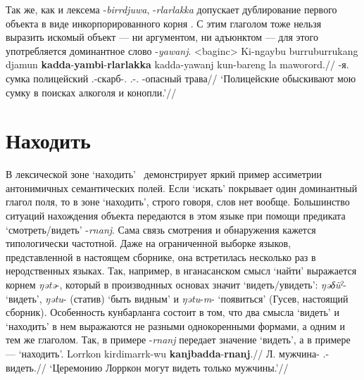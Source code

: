 Так же, как и лексема -\textit{birrdjuwa}, -\textit{rlarlakka} допускает дублирование первого объекта в виде инкорпорированного корня . С этим глаголом тоже нельзя выразить искомый объект --- ни аргументом, ни адъюнктом --- для этого употребляется доминантное слово -\textit{yawanj}.
\ex<baginc>\begingl
\gla Ki-ngaybu burruburrukang djamun \textbf{kadda}-\textbf{yambi}-\textbf{rlarlakka} kadda-yawanj kun-bareng la maworord.//
\glb \ki-я.\Gen{} сумка полицейский \Tpl.\Real-скарб-\rlk.\Np{} \Tpl.\Real-\yaw.\Np{} \Cliv-опасный \la{} трава//
\glft `Полицейские обыскивают мою сумку в поисках алкоголя и конопли.'//%
\endgl\xe


\section{Находить}
\label{sec:find}
В лексической зоне `находить' \ демонстрирует яркий пример ассиметрии антонимичных семантических полей. Если `искать' покрывает один доминантный глагол поля, то в зоне `находить', строго говоря, слов нет вообще. Большинство ситуаций нахождения объекта передаются в этом языке при помощи предиката `смотреть/видеть' -\textit{rnanj}. Сама связь смотрения и обнаружения кажется типологически частотной. Даже на ограниченной выборке языков, представленной в настоящем сборнике, она встретилась несколько раз в неродственных языках. Так, например, в нганасанском смысл `найти' выражается корнем \textit{ŋətə}-, который в производнных основах значит `видеть/увидеть': \textit{ŋəδüˀ}- `видеть', \textit{ŋətu}- (статив) `быть видным' и \textit{ŋətu}-\textit{m}- `появиться' (Гусев, настоящий сборник). Особенность кунбарланга состоит в том, что два смысла `видеть' и `находить' в нем выражаются не разными однокоренными формами, а одним и тем же глаголом. Так, в примере  -\textit{rnanj} передает значение `видеть', а в примере  --- `находить'.
\begingl
\gla Lorrkon kirdimarrk-wu \textbf{kanjbadda}-\textbf{rnanj}.//
\glb Л. мужчина-\Lim{} \Tpl.\Fut-видеть.\Np{}//
\glft `Церемонию Лорркон могут видеть только мужчины.'//%
\endgl\xe


